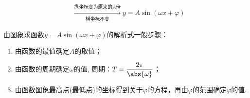 \begin{description}
\begin{minipage}[h]{0.55\linewidth}
\[\begin{aligned}
              &\xrightarrow[\text{横坐标不变}]{\text{纵坐标变为原来的}A\text{倍}}y=A\sin\left(\omega x+\varphi\right)
            \end{aligned}\]
        \end{minipage}
      \item 由图象求函数$y=A\sin\left(\omega x+\varphi\right)$的解析式一般步骤：
        \begin{enumerate}[label=\arabic*\degree]
          \item 由函数的最值确定$ A $的取值；
          \item 由函数的周期确定$ \omega $的值, 周期：$ T=\dfrac{2\pi}{\abs{\omega}} $；
          \item 由函数图象最高点(最低点)的坐标得到关于$ \varphi $的方程，再由$ \varphi $的范围确定$ \varphi $的值.
        \end{enumerate}
    \end{description}
